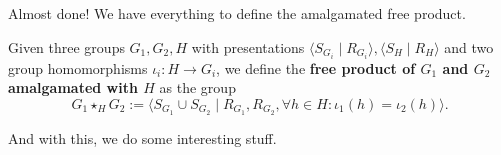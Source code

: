 Almost done! We have everything to define the amalgamated free product.
\begin{definition}
    Given three groups $G_1,G_2,H$ with presentations $\langle S_{G_i} \mid R_{G_i} \rangle, \langle S_H \mid R_H \rangle$ and two group homomorphisms $\iota_i: H \to G_i$, we define the \textbf{free product of $G_1$ and $G_2$ amalgamated with $H$} as the group 
    \begin{equation}
        G_1 \star_H G_2 := \langle S_{G_1} \cup S_{G_2}\mid R_{G_1}, R_{G_2}, \forall h \in H: \iota_1(h)=\iota_2(h)\rangle.
    \end{equation}
\end{definition}
And with this, we do some interesting stuff.
